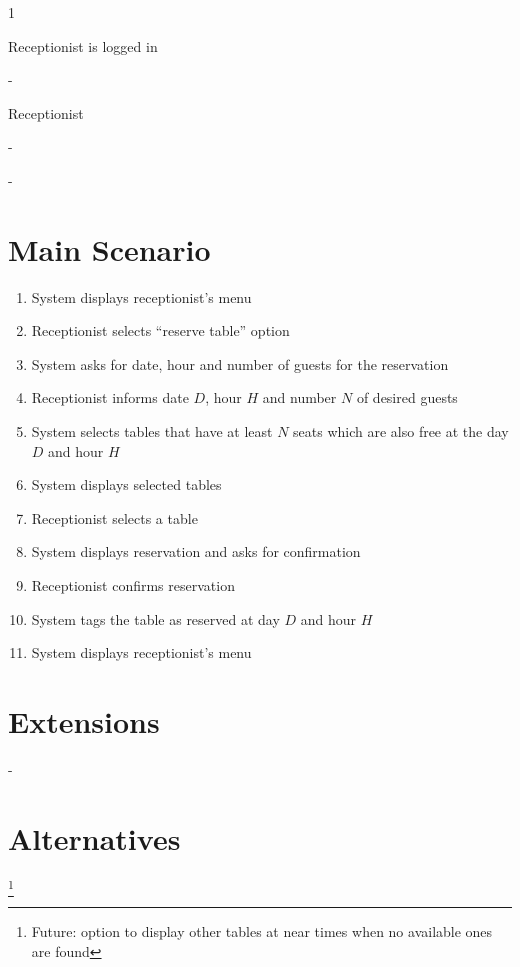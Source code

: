 \documentclass[a4paper,11pt,oneside]{book}
\begin{document}
\begin{description}[style=multiline,leftmargin=4cm]
  \item[Priority:] 1
  \item[Pre-conditions:] Receptionist is logged in
  \item[Post-conditions:] -
  \item[Primary Actor:] Receptionist
  \item[Other Actions:] -
  \item[Trigger:] -
\end{description}

\section{Main Scenario}

\begin{enumerate}
\item System displays receptionist's menu
\item Receptionist selects ``reserve table'' option
\item System asks for date, hour and number of guests for the reservation
\item Receptionist informs date $D$, hour $H$ and number $N$ of desired guests
\item System selects tables that have at least $N$ seats which are also free at the day $D$ and hour $H$
\item System displays selected tables
\item Receptionist selects a table
\item System displays reservation and asks for confirmation
\item Receptionist confirms reservation
\item System tags the table as reserved at day $D$ and hour $H$
\item System displays receptionist's menu
\end{enumerate}

\section{Extensions}

-

\section{Alternatives}\footnote{Future: option to display other tables at near times when no available ones are found}
\end{document}
